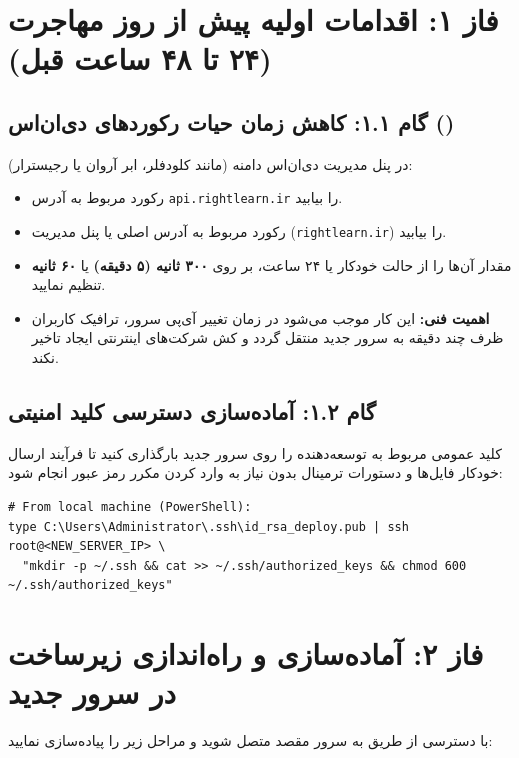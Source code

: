 \documentclass[11pt,a4paper]{article}
\begin{document}
\section{فاز ۱: اقدامات اولیه پیش از روز مهاجرت (۲۴ تا ۴۸ ساعت قبل)}

\subsection{گام ۱.۱: کاهش زمان حیات رکوردهای دی‌ان‌اس ()}
در پنل مدیریت دی‌ان‌اس دامنه (مانند کلودفلر، ابر آروان یا رجیسترار):
\begin{itemize}
    \item رکورد  مربوط به آدرس \verb|api.rightlearn.ir| را بیابید.
    \item رکورد  مربوط به آدرس اصلی یا پنل مدیریت (\verb|rightlearn.ir|) را بیابید.
    \item مقدار  آن‌ها را از حالت خودکار یا ۲۴ ساعت، بر روی \textbf{۳۰۰ ثانیه (۵ دقیقه)} یا \textbf{۶۰ ثانیه} تنظیم نمایید.
    \item \textbf{اهمیت فنی:} این کار موجب می‌شود در زمان تغییر آی‌پی سرور، ترافیک کاربران ظرف چند دقیقه به سرور جدید منتقل گردد و کش شرکت‌های اینترنتی ایجاد تاخیر نکند.
\end{itemize}

\subsection{گام ۱.۲: آماده‌سازی دسترسی کلید امنیتی }
کلید عمومی  مربوط به توسعه‌دهنده را روی سرور جدید بارگذاری کنید تا فرآیند ارسال خودکار فایل‌ها و دستورات ترمینال بدون نیاز به وارد کردن مکرر رمز عبور انجام شود:

\begin{latin}
\small
\begin{verbatim}
# From local machine (PowerShell):
type C:\Users\Administrator\.ssh\id_rsa_deploy.pub | ssh root@<NEW_SERVER_IP> \
  "mkdir -p ~/.ssh && cat >> ~/.ssh/authorized_keys && chmod 600 ~/.ssh/authorized_keys"
\end{verbatim}
\end{latin}

\section{فاز ۲: آماده‌سازی و راه‌اندازی زیرساخت در سرور جدید}
با دسترسی  از طریق  به سرور مقصد متصل شوید و مراحل زیر را پیاده‌سازی نمایید:
\end{document}
